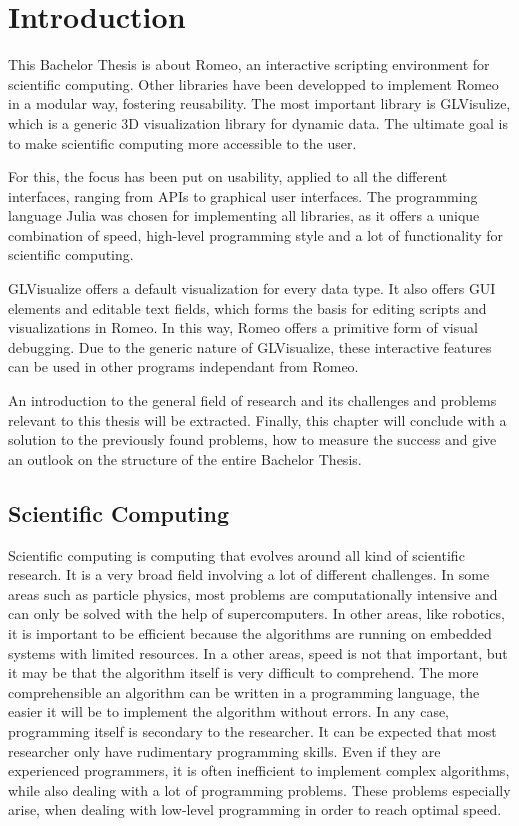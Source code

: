 \section{Introduction}
This Bachelor Thesis is about Romeo, an interactive scripting environment for scientific computing.
Other libraries have been developped to implement Romeo in a modular way, fostering reusability.
The most important library is GLVisulize, which is a generic 3D visualization library for dynamic data. 
The ultimate goal is to make scientific computing more accessible to the user. 

For this, the focus has been put on usability, applied to all the different interfaces, ranging from \ac{API}s to graphical user interfaces. 
The programming language Julia was chosen for implementing all libraries, as it offers a unique combination of speed, high-level programming style and a lot of functionality for scientific computing.

GLVisualize offers a default visualization for every data type. 
It also offers \ac{GUI} elements and editable text fields, which forms the basis for editing scripts and visualizations in Romeo. 
In this way, Romeo offers a primitive form of visual debugging. 
Due to the generic nature of GLVisualize, these interactive features can be used in other programs independant from Romeo.

An introduction to the general field of research and its challenges and problems relevant to this thesis will be extracted.
Finally, this chapter will conclude with a solution to the previously found problems, how to measure the success and give an outlook on the structure of the entire Bachelor Thesis.


\subsection{Scientific Computing}

Scientific computing is computing that evolves around all kind of scientific research.
It is a very broad field involving a lot of different challenges. 
In some areas such as particle physics, most problems are computationally intensive and can only be solved with the help of supercomputers.
In other areas, like robotics, it is important to be efficient because the algorithms are running on embedded systems with limited resources. 
In a other areas, speed is not that important, but it may be that the algorithm itself is very difficult to comprehend. 
The more comprehensible an algorithm can be written in a programming language, the easier it will be to implement the algorithm without errors.
In any case, programming itself is secondary to the researcher.
It can be expected that most researcher only have rudimentary programming skills. 
Even if they are experienced programmers, it is often inefficient to implement complex algorithms, while also dealing with a lot of programming problems.
These problems especially arise, when dealing with low-level programming in order to reach optimal speed.


